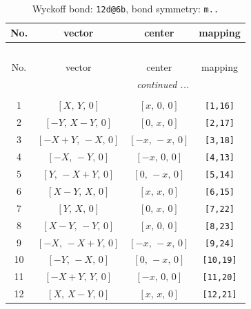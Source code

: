 \documentclass[fleqn,8pt]{jsarticle}
\begin{document}
\begin{longtable}{cccc}
\caption{Wyckoff bond: {\tt 12d@6b}, bond symmetry: {\tt m..}}
 \\
 \hline \hline
No. & vector & center & mapping \\ \hline \endfirsthead

\multicolumn{3}{l}{\tablename\ \thetable{}} \\
 \hline \hline
No. & vector & center & mapping \\ \hline \endhead

 \hline \hline
\multicolumn{3}{r}{\footnotesize\it continued ...} \\ \endfoot

 \hline \hline
\multicolumn{3}{r}{} \\ \endlastfoot

1 & $\left[ X,\, Y,\, 0 \right]$ & $\left[ x,\, 0,\, 0 \right]$ & {\tt [1,16]} \\ \hline
2 & $\left[ - Y,\, X - Y,\, 0 \right]$ & $\left[ 0,\, x,\, 0 \right]$ & {\tt [2,17]} \\ \hline
3 & $\left[ - X + Y,\, - X,\, 0 \right]$ & $\left[ - x,\, - x,\, 0 \right]$ & {\tt [3,18]} \\ \hline
4 & $\left[ - X,\, - Y,\, 0 \right]$ & $\left[ - x,\, 0,\, 0 \right]$ & {\tt [4,13]} \\ \hline
5 & $\left[ Y,\, - X + Y,\, 0 \right]$ & $\left[ 0,\, - x,\, 0 \right]$ & {\tt [5,14]} \\ \hline
6 & $\left[ X - Y,\, X,\, 0 \right]$ & $\left[ x,\, x,\, 0 \right]$ & {\tt [6,15]} \\ \hline
7 & $\left[ Y,\, X,\, 0 \right]$ & $\left[ 0,\, x,\, 0 \right]$ & {\tt [7,22]} \\ \hline
8 & $\left[ X - Y,\, - Y,\, 0 \right]$ & $\left[ x,\, 0,\, 0 \right]$ & {\tt [8,23]} \\ \hline
9 & $\left[ - X,\, - X + Y,\, 0 \right]$ & $\left[ - x,\, - x,\, 0 \right]$ & {\tt [9,24]} \\ \hline
10 & $\left[ - Y,\, - X,\, 0 \right]$ & $\left[ 0,\, - x,\, 0 \right]$ & {\tt [10,19]} \\ \hline
11 & $\left[ - X + Y,\, Y,\, 0 \right]$ & $\left[ - x,\, 0,\, 0 \right]$ & {\tt [11,20]} \\ \hline
12 & $\left[ X,\, X - Y,\, 0 \right]$ & $\left[ x,\, x,\, 0 \right]$ & {\tt [12,21]} \\
\end{longtable}
\renewcommand{\arraystretch}{1.2}
\end{document}
